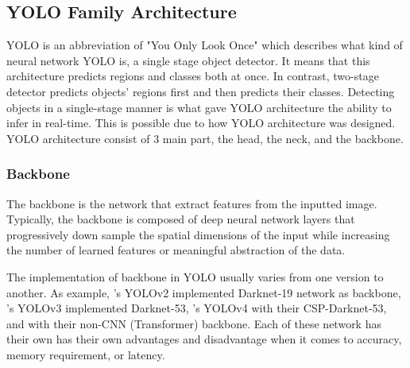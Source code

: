   \subsection{YOLO Family Architecture}
  YOLO is an abbreviation of "You Only Look Once" which describes what kind of neural network YOLO
  is, a single stage object detector. It means that this architecture predicts regions 
  and classes both at once. In contrast, two-stage detector predicts objects' regions first
  and then predicts their classes. Detecting objects in a single-stage manner is what gave YOLO
  architecture the ability to infer in real-time. This is possible due to how YOLO architecture
  was designed. YOLO architecture consist of 3 main part, the head, the neck, and the backbone.

   
    \subsubsection{Backbone}
    The backbone is the network that extract features from the inputted image.
    Typically, the backbone is composed of deep neural network layers that progressively 
    down sample the spatial dimensions of the input while increasing the number of 
    learned features or meaningful abstraction of the data.

    The implementation of backbone in YOLO usually varies from one version to another.
    As example, \textcite{yolov2}'s YOLOv2 implemented Darknet-19 network as backbone, 
    \textcite{yolov3}'s YOLOv3 implemented Darknet-53, \textcite{yolov4}'s YOLOv4
    with their CSP-Darknet-53, and \textcite{vityolo} with their non-CNN (Transformer) backbone.
    Each of these network has their own has their own advantages and disadvantage when
    it comes to accuracy, memory requirement, or latency.


